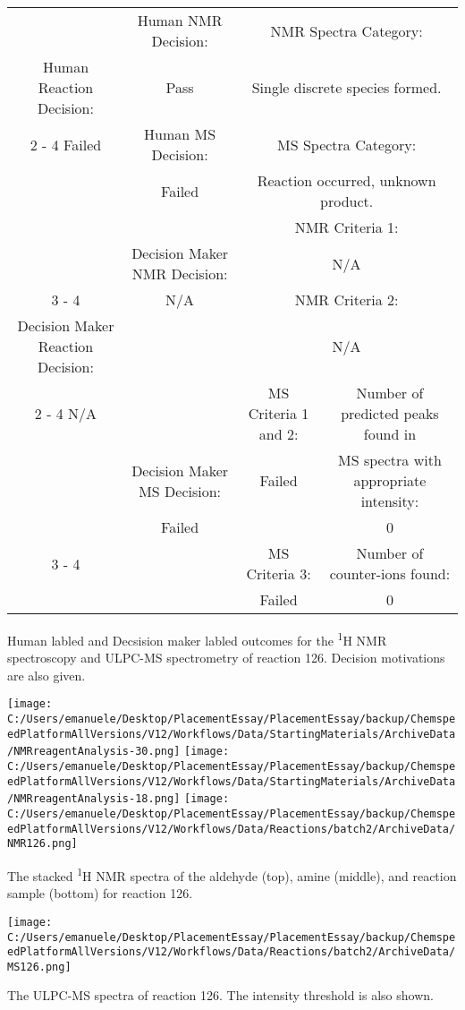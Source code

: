 \documentclass{article}%
\begin{document}
\begin{Decision Table}[H]%
\begin{tabular}{|c|c|c|c|}%
\hline%
&Human NMR Decision:&\multicolumn{2}{|c|}{NMR Spectra Category:}\\%
Human Reaction Decision:&Pass&\multicolumn{2}{|c|}{Single discrete species formed.}\\%
\cline{2%
-%
4}%
Failed&Human MS Decision:&\multicolumn{2}{|c|}{MS Spectra Category:}\\%
&Failed&\multicolumn{2}{|c|}{Reaction occurred, unknown product.}\\%
\hline%
&&\multicolumn{2}{|c|}{NMR Criteria 1:}\\%
&Decision Maker NMR Decision:&\multicolumn{2}{|c|}{N/A}\\%
\cline{3%
-%
4}%
&N/A&\multicolumn{2}{|c|}{NMR Criteria 2:}\\%
Decision Maker Reaction Decision:&&\multicolumn{2}{|c|}{N/A}\\%
\cline{2%
-%
4}%
N/A&&MS Criteria 1 and 2:&Number of predicted peaks found in\\%
&Decision Maker MS Decision:&Failed&MS spectra with appropriate intensity:\\%
&Failed&&0\\%
\cline{3%
-%
4}%
&&MS Criteria 3:&Number of counter{-}ions found:\\%
&&Failed&0\\%
\hline%
\end{tabular}%
\caption{Human labled and Decsision maker labled outcomes for the \textsuperscript{1}H NMR spectroscopy and ULPC-MS spectrometry of reaction 126. Decision motivations are also given.}%
\end{Decision Table}%
\begin{NMR Spectra}[H]%
\begin{center}%
\texttt{[image: C:/Users/emanuele/Desktop/PlacementEssay/PlacementEssay/backup/ChemspeedPlatformAllVersions/V12/Workflows/Data/StartingMaterials/ArchiveData/NMRreagentAnalysis-30.png]}\hfill%
\texttt{[image: C:/Users/emanuele/Desktop/PlacementEssay/PlacementEssay/backup/ChemspeedPlatformAllVersions/V12/Workflows/Data/StartingMaterials/ArchiveData/NMRreagentAnalysis-18.png]}\hfill%
\texttt{[image: C:/Users/emanuele/Desktop/PlacementEssay/PlacementEssay/backup/ChemspeedPlatformAllVersions/V12/Workflows/Data/Reactions/batch2/ArchiveData/NMR126.png]}\hfill%
\end{center}%
\caption{The stacked \textsuperscript{1}H NMR spectra of the aldehyde (top), amine (middle), and reaction sample (bottom) for reaction 126.}%
\end{NMR Spectra}%
\begin{MS Spectra}[H]%
\begin{center}%
\texttt{[image: C:/Users/emanuele/Desktop/PlacementEssay/PlacementEssay/backup/ChemspeedPlatformAllVersions/V12/Workflows/Data/Reactions/batch2/ArchiveData/MS126.png]}\hfill%
\end{center}%
\caption{The ULPC-MS spectra of reaction 126. The intensity threshold is also shown.}%
\end{MS Spectra}%
\end{document}
